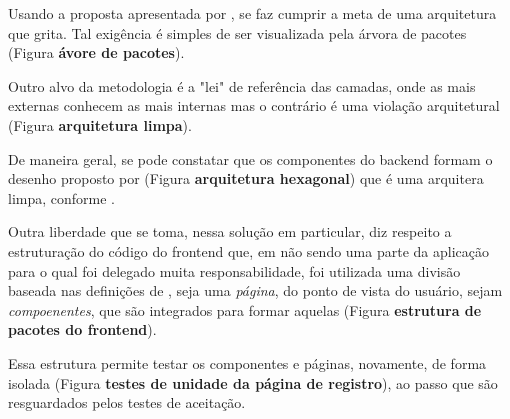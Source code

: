   Usando a proposta apresentada por , se faz cumprir a meta de uma arquitetura que grita. Tal exigência é simples de ser visualizada pela árvora de pacotes (Figura \textbf{ávore de pacotes}).

  Outro alvo da metodologia é a "lei" de referência das camadas, onde as mais externas conhecem as mais internas mas o contrário é uma violação arquitetural (Figura \textbf{arquitetura limpa}).

  De maneira geral, se pode constatar que os componentes do backend formam o desenho proposto por  (Figura \textbf{arquitetura hexagonal}) que é uma arquitera limpa, conforme .

  Outra liberdade que se toma, nessa solução em particular, diz respeito a estruturação do código do frontend que, em não sendo uma parte da aplicação para o qual foi delegado muita responsabilidade, foi utilizada uma divisão baseada nas definições de , seja uma \emph{página}, do ponto de vista do usuário, sejam \emph{compoenentes}, que são integrados para formar aquelas (Figura \textbf{estrutura de pacotes do frontend}).

  Essa estrutura permite testar os componentes e páginas, novamente, de forma isolada (Figura \textbf{testes de unidade da página de registro}), ao passo que são resguardados pelos testes de aceitação.
